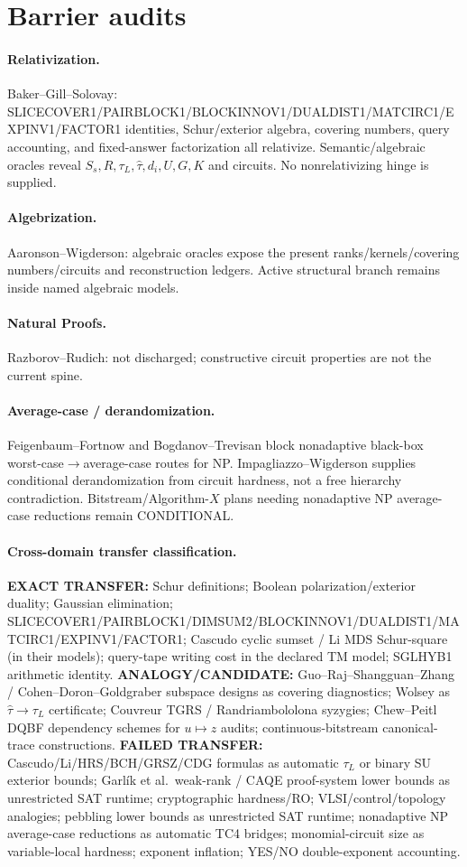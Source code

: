 \documentclass[11pt]{article}
\begin{document}
\section*{Barrier audits}
\paragraph{Relativization.}
Baker--Gill--Solovay: SLICECOVER1/PAIRBLOCK1/BLOCKINNOV1/DUALDIST1/MATCIRC1/EXPINV1/FACTOR1
identities, Schur/exterior algebra, covering numbers, query accounting, and fixed-answer
factorization all relativize. Semantic/algebraic oracles reveal
$S_s,R,\tau_L,\widehat\tau,d_i,U,G,K$ and circuits. No nonrelativizing hinge is supplied.
\paragraph{Algebrization.}
Aaronson--Wigderson: algebraic oracles expose the present ranks/kernels/covering numbers/circuits
and reconstruction ledgers. Active structural branch remains inside named algebraic models.
\paragraph{Natural Proofs.}
Razborov--Rudich: not discharged; constructive circuit properties are not the current spine.
\paragraph{Average-case / derandomization.}
Feigenbaum--Fortnow and Bogdanov--Trevisan block nonadaptive black-box worst-case$\to$average-case
routes for NP. Impagliazzo--Wigderson supplies conditional derandomization from circuit hardness,
not a free hierarchy contradiction. Bitstream/Algorithm-$X$ plans needing nonadaptive NP average-case
reductions remain CONDITIONAL.
\paragraph{Cross-domain transfer classification.}
\textbf{EXACT TRANSFER:} Schur definitions; Boolean polarization/exterior duality; Gaussian
elimination; SLICECOVER1/PAIRBLOCK1/DIMSUM2/BLOCKINNOV1/DUALDIST1/MATCIRC1/EXPINV1/FACTOR1;
Cascudo cyclic sumset / Li MDS Schur-square (in their models); query-tape writing cost in the
declared TM model; SGLHYB1 arithmetic identity.
\textbf{ANALOGY/CANDIDATE:} Guo--Raj--Shangguan--Zhang / Cohen--Doron--Goldgraber subspace designs
as covering diagnostics; Wolsey as $\widehat\tau\to\tau_L$ certificate; Couvreur TGRS /
Randriambololona syzygies; Chew--Peitl DQBF dependency schemes for $u\mapsto z$ audits;
continuous-bitstream canonical-trace constructions.
\textbf{FAILED TRANSFER:} Cascudo/Li/HRS/BCH/GRSZ/CDG formulas as automatic $\tau_L$ or binary SU
exterior bounds; Garl\'ik et al.\ weak-rank / CAQE proof-system lower bounds as unrestricted SAT
runtime; cryptographic hardness/RO; VLSI/control/topology analogies; pebbling lower bounds as
unrestricted SAT runtime; nonadaptive NP average-case reductions as automatic TC4 bridges;
monomial-circuit size as variable-local hardness; exponent inflation; YES/NO double-exponent
accounting.
\end{document}
